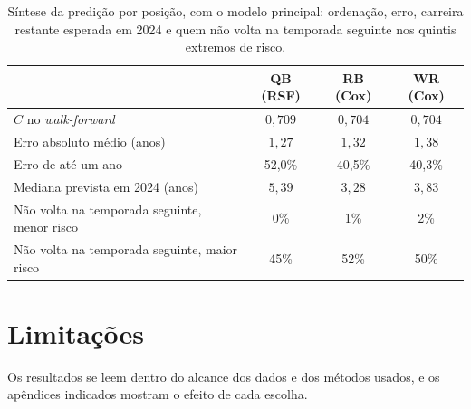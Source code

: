 \begin{table}[H]
\centering
\caption{Síntese da predição por posição, com o modelo principal: ordenação, erro, carreira restante esperada em 2024 e quem não volta na temporada seguinte nos quintis extremos de risco.}
\label{tab:sintese_preditiva}
\thesistablesetup
\begin{tabular*}{\textwidth}{@{\extracolsep{\fill}}lccc@{}}
\toprule
 & \textbf{QB (RSF)} & \textbf{RB (Cox)} & \textbf{WR (Cox)} \\
\midrule
$C$ no \textit{walk-forward} & $0{,}709$ & $0{,}704$ & $0{,}704$ \\
Erro absoluto médio (anos) & $1{,}27$ & $1{,}32$ & $1{,}38$ \\
Erro de até um ano & 52,0\% & 40,5\% & 40,3\% \\
Mediana prevista em 2024 (anos) & $5{,}39$ & $3{,}28$ & $3{,}83$ \\
Não volta na temporada seguinte, menor risco & 0\% & 1\% & 2\% \\
Não volta na temporada seguinte, maior risco & 45\% & 52\% & 50\% \\
\bottomrule
\end{tabular*}
\end{table}

\section{Limitações}
\label{sec:limitacoes}

Os resultados se leem dentro do alcance dos dados e dos métodos usados, e os apêndices indicados mostram o efeito de cada escolha.

